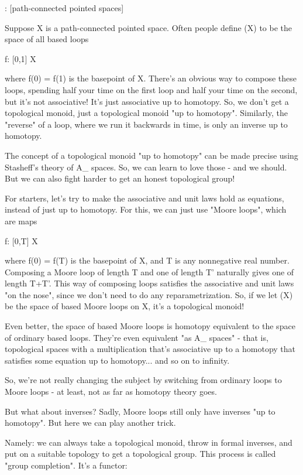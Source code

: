 \Omega : [path-connected pointed spaces] 

Suppose X is a path-connected pointed space.  Often people define
\Omega (X) to be the space of all based loops

f: [0,1] \to  X

where f(0) = f(1) is the basepoint of X.  There's an obvious way to
compose these loops, spending half your time on the first loop and
half your time on the second, but it's not associative!  It's just
associative up to homotopy.  So, we don't get a topological monoid,
just a topological monoid "up to homotopy".  Similarly, the "reverse"
of a loop, where we run it backwards in time, is only an inverse up to
homotopy.

The concept of a topological monoid "up to homotopy" can be made
precise using Stasheff's theory of A_{\infty } spaces.  So, we can
learn to love those - and we should.  But we can also fight harder to
get an honest topological group!

For starters, let's try to make the associative and unit laws hold as
equations, instead of just up to homotopy.  For this, we can just use
"Moore loops", which are maps

f: [0,T] \to  X 

where f(0) = f(T) is the basepoint of X, and T is any nonnegative real
number.  Composing a Moore loop of length T and one of length T'
naturally gives one of length T+T'.  This way of composing loops
satisfies the associative and unit laws "on the nose", since we don't
need to do any reparametrization.  So, if we let \Omega (X) be the space
of based Moore loops on X, it's a topological monoid!

Even better, the space of based Moore loops is homotopy equivalent to
the space of ordinary based loops.  They're even equivalent "as
A_{\infty } spaces" - that is, topological spaces with a
multiplication that's associative up to a homotopy that satisfies some
equation up to homotopy... and so on to infinity.

So, we're not really changing the subject by switching from ordinary
loops to Moore loops - at least, not as far as homotopy theory goes.

But what about inverses?  Sadly, Moore loops still only have inverses
"up to homotopy".  But here we can play another trick.  

Namely: we can always take a topological monoid, throw in formal
inverses, and put on a suitable topology to get a topological group.
This process is called "group completion".  It's a functor:

